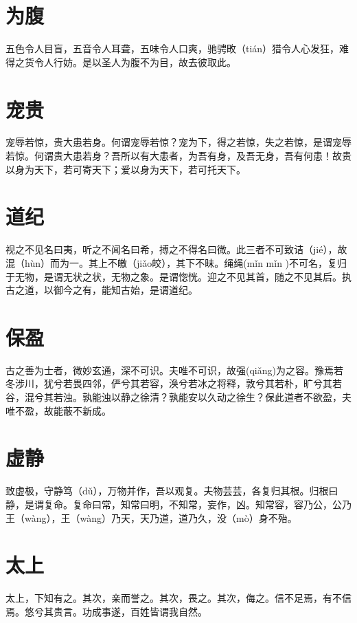 \documentclass[a4paper,12pt,UTF8,twoside]{ctexbook}
\begin{document}
	\chapter{为腹}
	
	五色令人目盲，五音令人耳聋，五味令人口爽，驰骋畋（tián）猎令人心发狂，难得之货令人行妨。是以圣人为腹不为目，故去彼取此。
	
	\chapter{宠贵}
	
	宠辱若惊，贵大患若身。何谓宠辱若惊？宠为下，得之若惊，失之若惊，是谓宠辱若惊。何谓贵大患若身？吾所以有大患者，为吾有身，及吾无身，吾有何患！故贵以身为天下，若可寄天下；爱以身为天下，若可托天下。
	
	\chapter{道纪}
	视之不见名曰夷，听之不闻名曰希，搏之不得名曰微。此三者不可致诘（jié），故混（hùn）而为一。其上不皦（jiǎo皎），其下不昧。绳绳(mǐn mǐn )不可名，复归于无物，是谓无状之状，无物之象。是谓惚恍。迎之不见其首，随之不见其后。执古之道，以御今之有，能知古始，是谓道纪。
	
	
	
	\chapter{保盈}
	
	古之善为士者，微妙玄通，深不可识。夫唯不可识，故强(qiǎng)为之容。豫焉若冬涉川，犹兮若畏四邻，俨兮其若容，涣兮若冰之将释，敦兮其若朴，旷兮其若谷，混兮其若浊。孰能浊以静之徐清？孰能安以久动之徐生？保此道者不欲盈，夫唯不盈，故能蔽不新成。
	
	
	
	\chapter{虚静}
	
	致虚极，守静笃（dǔ），万物并作，吾以观复。夫物芸芸，各复归其根。归根曰静，是谓复命。复命曰常，知常曰明，不知常，妄作，凶。知常容，容乃公，公乃王（wàng），王（wàng）乃天，天乃道，道乃久，没（mò）身不殆。
	
	

	
	
	
	\chapter{太上}
	太上，下知有之。其次，亲而誉之。其次，畏之。其次，侮之。信不足焉，有不信焉。悠兮其贵言。功成事遂，百姓皆谓我自然。
	
\end{document}
